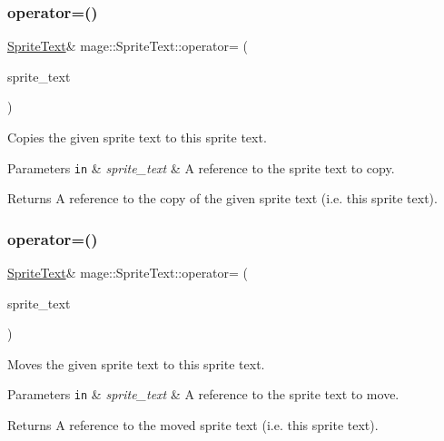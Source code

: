 \subsubsection{\texorpdfstring{operator=()}{operator=()}\hspace{0.1cm}{\footnotesize\ttfamily [1/2]}}
{\footnotesize\ttfamily \hyperlink{classmage_1_1_sprite_text}{Sprite\+Text}\& mage\+::\+Sprite\+Text\+::operator= (\begin{DoxyParamCaption}\item[{const \hyperlink{classmage_1_1_sprite_text}{Sprite\+Text} \&}]{sprite\+\_\+text }\end{DoxyParamCaption})\hspace{0.3cm}{\ttfamily [delete]}}

Copies the given sprite text to this sprite text.


\begin{DoxyParams}[1]{Parameters}
\mbox{\tt in}  & {\em sprite\+\_\+text} & A reference to the sprite text to copy. \\
\hline
\end{DoxyParams}
\begin{DoxyReturn}{Returns}
A reference to the copy of the given sprite text (i.\+e. this sprite text). 
\end{DoxyReturn}
\hypertarget{classmage_1_1_sprite_text_a7e2e165d7682d9cc623b7c9725f76920}{}\label{classmage_1_1_sprite_text_a7e2e165d7682d9cc623b7c9725f76920} 
\subsubsection{\texorpdfstring{operator=()}{operator=()}\hspace{0.1cm}{\footnotesize\ttfamily [2/2]}}
{\footnotesize\ttfamily \hyperlink{classmage_1_1_sprite_text}{Sprite\+Text}\& mage\+::\+Sprite\+Text\+::operator= (\begin{DoxyParamCaption}\item[{\hyperlink{classmage_1_1_sprite_text}{Sprite\+Text} \&\&}]{sprite\+\_\+text }\end{DoxyParamCaption})\hspace{0.3cm}{\ttfamily [delete]}}

Moves the given sprite text to this sprite text.


\begin{DoxyParams}[1]{Parameters}
\mbox{\tt in}  & {\em sprite\+\_\+text} & A reference to the sprite text to move. \\
\hline
\end{DoxyParams}
\begin{DoxyReturn}{Returns}
A reference to the moved sprite text (i.\+e. this sprite text). 
\end{DoxyReturn}
\hypertarget{classmage_1_1_sprite_text_a46235c90d3fc9872c2342cd17eaa9e89}{}\label{classmage_1_1_sprite_text_a46235c90d3fc9872c2342cd17eaa9e89} 
